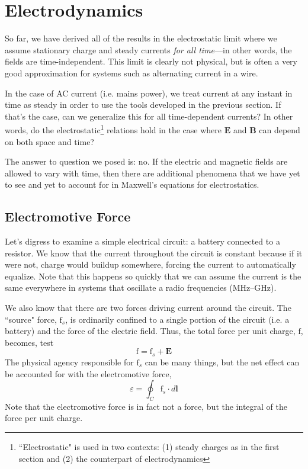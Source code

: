 \documentclass[12pt]{report}
\numberwithin{equation}{section}
\def\f{{\mbox{$\boldsymbol{\mathrm{f}}$}}}
\def\E{{\mbox{$\boldsymbol{E}$}}}
\def\B{{\mbox{$\boldsymbol{B}$}}}
\newcommand{\bd}[1]{\boldsymbol{#1}}
\begin{document}
	\chapter{Electrodynamics}
	
	So far, we have derived all of the results in the electrostatic limit where we assume stationary charge and steady currents \textit{for all time}---in other words, the fields are time-independent. This limit is clearly not physical, but is often a very good approximation for systems such as alternating current in a wire. 
	
	In the case of AC current (i.e. mains power), we treat current at any instant in time as steady in order to use the tools developed in the previous section. If that's the case, can we generalize this for all time-dependent currents? In other words, do the electrostatic\footnote{``Electrostatic" is used in two contexts: (1) steady charges as in the first section and (2) the counterpart of electrodynamics} relations hold in the case where $ \E $ and $ \B $ can depend on both space and time?
	
	The answer to question we posed is: no. If the electric and magnetic fields are allowed to vary with time, then there are additional phenomena that we have yet to see and yet to account for in Maxwell's equations for electrostatics.
	
	\section{Electromotive Force}
	Let's digress to examine a simple electrical circuit: a battery connected to a resistor. We know that the current throughout the circuit is constant because if it were not, charge would buildup somewhere, forcing the current to automatically equalize. Note that this happens so quickly that we can assume the current is the same everywhere in systems that oscillate a radio frequencies (MHz--GHz). 
	
	We also know that there are two forces driving current around the circuit. The ``source" force, $ \f_s $, is ordinarily confined to a single portion of the circuit (i.e. a battery) and the force of the electric field. Thus, the total force per unit charge, $ \f$, becomes, test
	\begin{equation}
		\f = \f_s + \E
	\end{equation} 
	The physical agency responsible for $ \f_s $ can be many things, but the net effect can be accounted for with the electromotive force,
	\begin{equation}
		\boxed{\varepsilon = \oint_C \f_s\cdot d\bd{l}}
	\end{equation}
	Note that the electromotive force is in fact not a force, but the integral of the force per unit charge.
	
\end{document}
